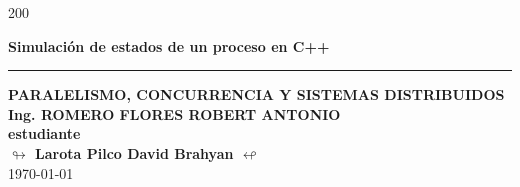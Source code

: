 \begin{titlepage}
\begin{textblock}{200}
\begin{center}
            \vspace*{\fill}
                \begin{minipage}{0.9\textwidth}
                    \centering
                    {\Large {\textbf{Simulación de estados de un proceso en C++}}}\par
                \end{minipage}
            \vspace*{\fill}
            \textcolor{azul}{\rule{0.5\linewidth}{0.80mm}} \par
            \vspace{8mm}
            {\large{\textbf{ PARALELISMO, CONCURRENCIA Y SISTEMAS DISTRIBUIDOS }}} \\[10pt]
            {\large{\textbf{\textcolor{azul}{Ing. ROMERO FLORES ROBERT ANTONIO }}}} \\[20pt]
            {\large{\textbf{estudiante}}}\\[10pt]
            {\large{\textbf{$\looparrowright$   Larota Pilco David Brahyan  $\looparrowleft$ }}}\\[5pt]
            \today

        \end{center}
    \end{textblock}
\end{titlepage}
%
%
%
